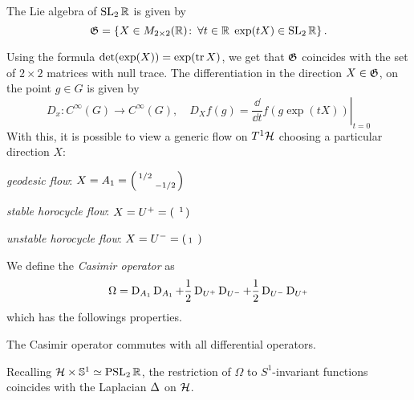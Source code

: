 \begin{defin}
The Lie algebra of $\operatorname{SL}_{2}\mathbb{R}$ is given by
\[
\mathfrak{G}=\left\{
X\in M_{2\times 2}(\mathbb{R})\colon\,\forall t\in\mathbb{R}\;\exp(tX)\in\operatorname{SL}_{2}\mathbb{R}
\right\}.
\]
\end{defin}
Using the formula $\det(\exp(X))=\exp(\operatorname{tr} X)$, we get that $\mathfrak{G}$ coincides with the set of $2\times2$ matrices with null trace. The differentiation in the direction $X\in\mathfrak{G}$, on the point $g\in G$ is given by
\[
D_{x}\colon C^{\infty}(G)\to C^{\infty}(G),\quad D_{X} f(g)=\left.\frac{\dd}{\dd t}f(g\exp(tX))\right|_{t=0}
\]
With this, it is possible to view a generic flow on $T^{1}\mathcal{H}$ choosing a particular direction $X$:
\begin{compactitem}
\item \emph{geodesic flow}: $X=A_{1}=\left(\begin{smallmatrix} 1/2&\\&-1/2 \end{smallmatrix}\right)$
\item \emph{stable horocycle flow}: $X=U^{+}=\left(\begin{smallmatrix} &1\\& \end{smallmatrix}\right)$
\item \emph{unstable horocycle flow}: $X=U^{-}=\left(\begin{smallmatrix} &\\1& \end{smallmatrix}\right)$
\end{compactitem}


We define the \emph{Casimir operator} as 
\[
\Omega=\operatorname{D}_{A_{1}}\operatorname{D}_{A_{1}}+\frac{1}{2}\operatorname{D}_{U^{+}}\operatorname{D}_{U^{-}}+\frac{1}{2}\operatorname{D}_{U^{-}}\operatorname{D}_{U^{+}}
\]
which has the followings properties.
\begin{lem}
\item The Casimir operator commutes with all differential operators.
\item Recalling $\mathcal{H}\times\mathbb{S}^{1}\simeq\operatorname{PSL}_{2}\mathbb{R}$, the restriction of $\Omega$ to $S^{1}$-invariant functions coincides with the Laplacian $\operatorname{\Delta}$ on $\mathcal{H}$. 
\end{lem}

